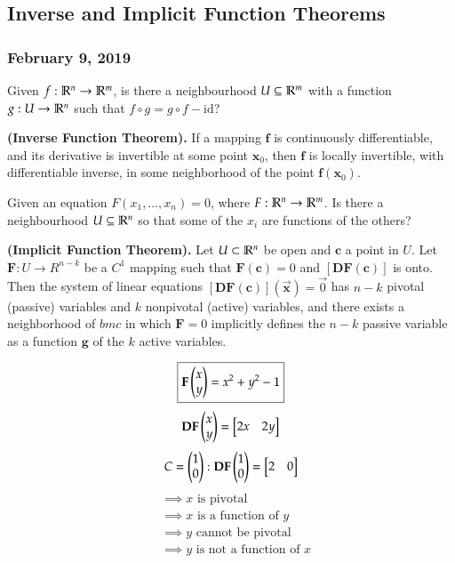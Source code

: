 \subsection{Inverse and Implicit Function Theorems}
\subsubsection*{February 9, 2019}

Given $f : \mathbb{R}^n \to \mathbb{R}^m$, is there a neighbourhood $U\subseteq \mathbb{R}^m$ with a function $g : U \to \mathbb{R}^n$ such that $f\circ g = g\circ f - \mathrm{id}$?

\begin{theorem}
\textbf{(Inverse Function Theorem).} If a mapping $\bm{f}$ is continuously differentiable, and its derivative is invertible at some point $\bm{x}_0$, then $\bm{f}$ is locally invertible, with differentiable inverse, in some neighborhood of the point $\bm{f}(\bm{x}_0)$. 
\end{theorem}

Given an equation $F(x_1, \dots, x_n) = 0$, where $F : \mathbb{R}^n \to \mathbb{R}^m$. Is there a neighbourhood $U \subseteq \mathbb{R}^n$ so that some of the $x_i$ are functions of the others?

\begin{theorem}
  \textbf{(Implicit Function Theorem).} Let $U\subset \mathbb{R}^n$ be open and $\bm{c}$ a point in $U$. Let $\bm{F} : U \to R^{n-k}$ be a $C^1$ mapping such that $\bm{F}(\bm{c})=0$ and $[\bm{DF}(\bm{c})]$ is onto. Then the system of linear equations $[\bm{DF}(\bm{c})](\vec{\bm{x}})=\vec{0}$ has $n-k$ pivotal (passive) variables and $k$ nonpivotal (active) variables, and there exists a neighborhood of $bm{c}$ in which $\bm{F}=0$ implicitly defines the $n-k$ passive variable as a function $\bm{g}$ of the $k$ active variables.
\end{theorem}

\example
\[\boxed{\textbf{F}\begin{pmatrix} x \\ y \end{pmatrix} = x^2 + y^2 -1}\]
\[\textbf{DF}\begin{pmatrix} x \\ y \end{pmatrix} = \begin{bmatrix} 2x & 2y \end{bmatrix}\]
\[C = \begin{pmatrix} 1 \\ 0 \end{pmatrix} : \textbf{DF}\begin{pmatrix} 1 \\ 0 \end{pmatrix}=\begin{bmatrix} 2 & 0 \end{bmatrix}\]
\begin{align*}
  &\implies \text{$x$ is pivotal} \\
  &\implies \text{$x$ is a function of $y$} \\
  &\implies \text{$y$ cannot be pivotal} \\
  &\implies \text{$y$ is not a function of $x$}
\end{align*}


